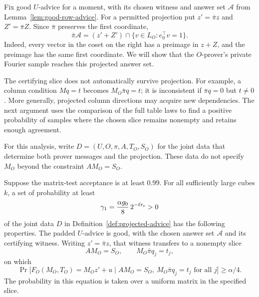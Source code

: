 Fix good $U$-advice for a moment, with its chosen witness and answer set
$\mathcal A$ from Lemma~\ref{lem:good-row-advice}.  For a permitted
projection put $z'=\bar\pi z$ and $Z'=\bar\pi Z$.  Since $\bar\pi$
preserves the first coordinate,
\begin{equation}
 \bar\pi\mathcal A
 =(z'+Z')\cap\{v\in L_O:e_0^\top v=1\}.
 \label{eq:projected-answer-set}
\end{equation}
Indeed, every vector in the coset on the right has a preimage in $z+Z$,
and the preimage has the same first coordinate.  We will show that the
$O$-prover's private Fourier sample reaches this projected answer set.

The certifying slice does not automatically survive projection.  For
example, a column condition $Mq=t$ becomes $M_O\bar\pi q=t$; it is
inconsistent if $\bar\pi q=0$ but $t\ne0$.  More generally, projected
column directions may acquire new dependencies.  The next argument uses
the comparison of the full table laws to find a positive probability of samples
where the chosen slice remains nonempty and retains enough agreement.

For this analysis, write
$D=(U,O,\pi,A,T_O,S_O)$ for the joint data that determine both prover
messages and the projection.  These data do not specify $M_O$ beyond the
constraint $AM_O=S_O$.

\begin{lemma}
\label{lem:projected-witness}
Suppose the matrix-test acceptance is at least $0.99$.  For all sufficiently
large cubes $k$, a set of probability at least
\begin{equation}
 \gamma_1=\frac{\alpha g_0}{8}\,2^{-\ell r_{\rm s}}>0
 \label{eq:projected-witness-mass}
\end{equation}
of the joint data $D$ in
Definition~\ref{def:projected-advice} has the following properties.
The padded $U$-advice is good, with the chosen answer set $\mathcal A$ and its
certifying witness.  Writing $z'=\bar\pi z$, that witness transfers to a
nonempty slice
\[
 AM_O=S_O,\qquad M_O\bar\pi q_j=t_j,
\]
on which
\begin{equation}
 \Pr\bigl[F_O(M_O,T_O)=M_Oz'+u\mid
           AM_O=S_O,\ M_O\bar\pi q_j=t_j\text{ for all }j\bigr]
 \ge\alpha/4.
 \label{eq:transferred-witness}
\end{equation}
The probability in this equation is taken over a uniform matrix in the
specified slice.
\end{lemma}

